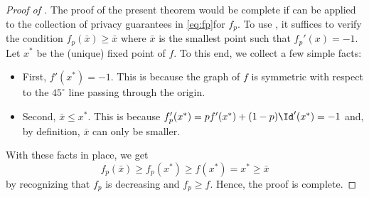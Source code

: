 \begin{proof}[Proof of ]
The proof of the present theorem would be complete if  can be applied to the collection of privacy guarantees in \eqref{eq:fp}for $f_p$. To use , it suffices to verify the condition $f_p(\bar{x})\geqslant \bar{x}$ where $\bar{x}$ is the smallest point such that $f_p'(x)=-1$. Let $x^*$ be the (unique) fixed point of $f$. To this end, we collect a few simple facts:
	\begin{itemize}
		\item First, $f'(x^*) = -1$. This is because the graph of $f$ is symmetric with respect to the $45^\circ$ line passing through the origin.
		\item Second, $\bar{x}\leqslant x^*$. This is because $f_p'(x^*)=pf'(x^*)+(1-p)\Id'(x^*)=-1$ and, by definition, $\bar{x}$ can only be smaller.
	\end{itemize}
With these facts in place, we get
\[f_p(\bar{x})\geqslant f_p(x^*) \geqslant f(x^*) = x^* \geqslant \bar{x}\]
by recognizing that $f_p$ is decreasing and $f_p \ge f$. Hence, the proof is complete.

\end{proof}



